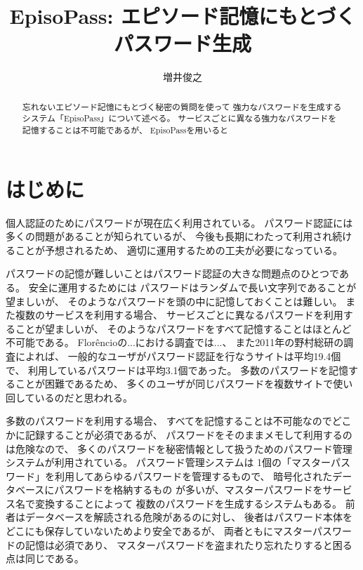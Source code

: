 \documentclass[twoside]{wiss}
\begin{document}
\title{EpisoPass: エピソード記憶にもとづくパスワード生成}

\author{増井俊之}

\begin{abstract}
忘れないエピソード記憶にもとづく秘密の質問を使って
強力なパスワードを生成するシステム「EpisoPass」について述べる。
サービスごとに異なる強力なパスワードを記憶することは不可能であるが、
EpisoPassを用いると
\end{abstract}

\maketitle

\section{はじめに}

個人認証のためにパスワードが現在広く利用されている。
パスワード認証には多くの問題があることが知られているが\cite{増井_ユニマガ}、
今後も長期にわたって利用され続けることが予想されるため、
適切に運用するための工夫が必要になっている。

パスワードの記憶が難しいことはパスワード認証の大きな問題点のひとつである。
安全に運用するためには
パスワードはランダムで長い文字列であることが望ましいが、
そのようなパスワードを頭の中に記憶しておくことは難しい。
また複数のサービスを利用する場合、
サービスごとに異なるパスワードを利用することが望ましいが、
そのようなパスワードをすべて記憶することはほとんど不可能である。
%
Flor\^{e}ncioの...における調査では...\cite{Florencio:2007:LSW:1242572.1242661}、
また2011年の野村総研の調査によれば、
一般的なユーザがパスワード認証を行なうサイトは平均19.4個で、
利用しているパスワードは平均3.1個であった\cite{野村総研}。
多数のパスワードを記憶することが困難であるため、
多くのユーザが同じパスワードを複数サイトで使い回しているのだと思われる。

多数のパスワードを利用する場合、
すべてを記憶することは不可能なのでどこかに記録することが必須であるが、
パスワードをそのままメモして利用するのは危険なので、
多くのパスワードを秘密情報として扱うためのパスワード管理システムが利用されている。
パスワード管理システムは
1個の「マスターパスワード」を利用してあらゆるパスワードを管理するもので、
暗号化されたデータベースにパスワードを格納するもの%
\cite{OnePassword}%
\cite{Dashlane}%
\cite{ミルパス}%
\cite{LastPass}%
\cite{KeyPass}%
\cite{NortonIDSafe}%
\cite{IDManager}%
が多いが、マスターパスワードをサービス名で変換することによって
複数のパスワードを生成するシステム\cite{SuperGenPass}もある。
前者はデータベースを解読される危険があるのに対し、
後者はパスワード本体をどこにも保存していないためより安全であるが、
両者ともにマスターパスワードの記憶は必須であり、
マスターパスワードを盗まれたり忘れたりすると困る点は同じである。
\end{document}
